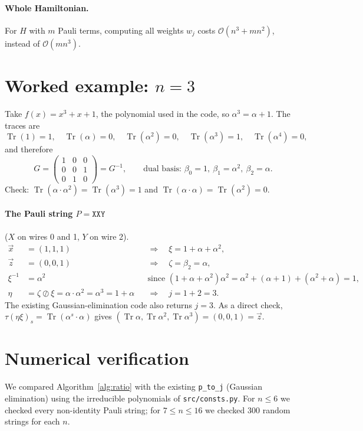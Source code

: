 \documentclass[11pt]{article}
\theoremstyle{definition}
\theoremstyle{remark}
\newcommand{\Tr}{\operatorname{Tr}}
\newcommand{\vx}{\vec{x}}
\newcommand{\vz}{\vec{z}}
\begin{document}
\paragraph{Whole Hamiltonian.}
For $H$ with $m$ Pauli terms, computing all weights $w_j$ costs $\mathcal{O}(n^3+mn^2)$, instead of $\mathcal{O}(mn^3)$.

\section{Worked example: $n=3$}

Take $f(x)=x^3+x+1$, the polynomial used in the code, so $\alpha^3=\alpha+1$.
The traces are
\[
  \Tr(1)=1,\quad \Tr(\alpha)=0,\quad \Tr(\alpha^2)=0,\quad \Tr(\alpha^3)=1,\quad \Tr(\alpha^4)=0,
\]
and therefore
\[
  G=\begin{pmatrix}1&0&0\\0&0&1\\0&1&0\end{pmatrix}=G^{-1},
  \qquad\text{dual basis: } \beta_0=1,\ \beta_1=\alpha^2,\ \beta_2=\alpha .
\]
Check: $\Tr(\alpha\cdot\alpha^2)=\Tr(\alpha^3)=1$ and $\Tr(\alpha\cdot\alpha)=\Tr(\alpha^2)=0$.

\paragraph{The Pauli string $P=\texttt{XXY}$} ($X$ on wires 0 and 1, $Y$ on wire 2).
\begin{align*}
  \vx&=(1,1,1) &&\Rightarrow\quad \xi=1+\alpha+\alpha^2,\\
  \vz&=(0,0,1) &&\Rightarrow\quad \zeta=\beta_2=\alpha,\\
  \xi^{-1}&=\alpha^2 &&\text{since } (1+\alpha+\alpha^2)\alpha^2=\alpha^2+(\alpha+1)+(\alpha^2+\alpha)=1,\\
  \eta&=\zeta\oslash\xi=\alpha\cdot\alpha^2=\alpha^3=1+\alpha &&\Rightarrow\quad j=1+2=3 .
\end{align*}
The existing Gaussian-elimination code also returns $j=3$.
As a direct check, $\tau(\eta\xi)_s=\Tr(\alpha^s\cdot\alpha)$ gives $(\Tr\alpha,\Tr\alpha^2,\Tr\alpha^3)=(0,0,1)=\vz$.

\section{Numerical verification}

We compared Algorithm~\ref{alg:ratio} with the existing \texttt{p\_to\_j} (Gaussian elimination) using the irreducible polynomials of \texttt{src/consts.py}.
For $n\le6$ we checked every non-identity Pauli string; for $7\le n\le 16$ we checked 300 random strings for each $n$.
\end{document}

